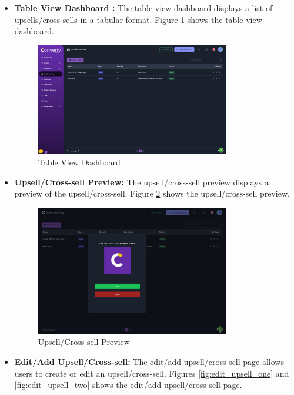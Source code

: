 \begin{itemize}
    \item \textbf{Table View Dashboard :} The table view dashboard displays a list of upsells/cross-sells in a tabular format. Figure \ref{fig:table_view_dashboard} shows the table view dashboard.
    \begin{figure}[H]
        \centering
        \includegraphics[width=0.8\textwidth]{images/tableViewDashboard.png}
        \caption{Table View Dashboard}
        \label{fig:table_view_dashboard}
    \end{figure}
    \item \textbf{Upsell/Cross-sell Preview:} The upsell/cross-sell preview displays a preview of the upsell/cross-sell. Figure \ref{fig:upsell_preview} shows the upsell/cross-sell preview.
    \begin{figure}[H]
        \centering
        \includegraphics[width=0.8\textwidth]{images/upsellPreview.png}
        \caption{Upsell/Cross-sell Preview}
        \label{fig:upsell_preview}
    \end{figure}
    \item \textbf{Edit/Add Upsell/Cross-sell:} The edit/add upsell/cross-sell page allows users to create or edit an upsell/cross-sell. Figures \ref{fig:edit_upsell_one} and \ref{fig:edit_upsell_two} shows the edit/add upsell/cross-sell page.

\end{itemize}
